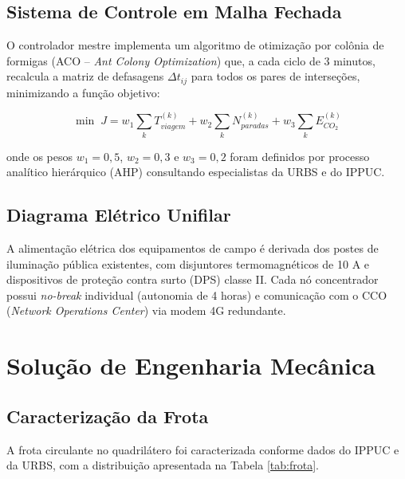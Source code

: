 \documentclass[12pt,a4paper,oneside]{abntex2}
\begin{document}
\subsection{Sistema de Controle em Malha Fechada}

O controlador mestre implementa um algoritmo de otimização por colônia de formigas (ACO -- \textit{Ant Colony Optimization}) que, a cada ciclo de 3 minutos, recalcula a matriz de defasagens $\Delta t_{ij}$ para todos os pares de interseções, minimizando a função objetivo:

\begin{equation}
\min \; J = w_1 \sum_{k} T_{viagem}^{(k)} + w_2 \sum_{k} N_{paradas}^{(k)} + w_3 \sum_{k} E_{CO_2}^{(k)}
\label{eq:obj}
\end{equation}

onde os pesos $w_1=0,5$, $w_2=0,3$ e $w_3=0,2$ foram definidos por processo analítico hierárquico (AHP) consultando especialistas da URBS e do IPPUC.

\subsection{Diagrama Elétrico Unifilar}

A alimentação elétrica dos equipamentos de campo é derivada dos postes de iluminação pública existentes, com disjuntores termomagnéticos de 10 A e dispositivos de proteção contra surto (DPS) classe II. Cada nó concentrador possui \textit{no-break} individual (autonomia de 4 horas) e comunicação com o CCO (\textit{Network Operations Center}) via modem 4G redundante.

\section{Solução de Engenharia Mecânica}

\subsection{Caracterização da Frota}

A frota circulante no quadrilátero foi caracterizada conforme dados do IPPUC e da URBS, com a distribuição apresentada na Tabela \ref{tab:frota}.
\end{document}
